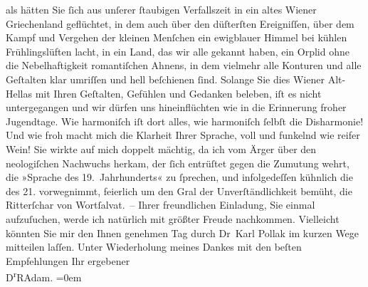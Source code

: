 \begin{ledgroupsized}[t]{13cm}
               als hätten Sie ſich aus unſerer ſtaubigen Verfallszeit in ein altes Wiener Griechenland
               geflüchtet, in dem auch über den düſterſten Ereigniſſen, über dem Kampf und Vergehen
                  der kleinen Menſchen ein ewigblauer
               Himmel bei kühlen Frühlingslüften lacht, in ein Land, das wir alle gekannt haben, ein
               Orplid ohne die Nebelhaftigkeit romantiſchen Ahnens, in dem vielmehr alle Konturen
               und alle Geſtalten klar umriſſen und hell beſchienen ſind. Solange Sie dies Wiener Alt-Hellas mit Ihren Geſtalten, Gefühlen und Gedanken beleben, iſt es nicht
               untergegangen und wir dürfen uns hineinflüchten wie in die Erinnerung froher
               Jugendtage. Wie harmoniſch iſt dort alles, wie harmoniſch ſelbſt die Disharmonie! Und
               wie froh macht mich die Klarheit Ihrer {\pb}Sprache, voll und funkelnd wie reifer Wein! Sie wirkte auf mich doppelt mächtig, da
               ich vom Ärger über den neologiſchen Nachwuchs herkam, der ſich entrüſtet gegen die
               Zumutung wehrt, die »Sprache des 19. Jahrhunderts« zu ſprechen, und infolgedeſſen
               kühnlich die des 21. vorwegnimmt, feierlich um den Gral der Unverſtändlichkeit
               bemüht, die Ritterſchar von Wortſalvat. –\pend
           \pstart
           Ihrer freundlichen Einladung, Sie einmal aufzuſuchen, werde ich natürlich mit größter
               Freude nachkommen. Vielleicht könnten Sie mir den Ihnen genehmen Tag durch Dr Karl Pollak im kurzen Wege mitteilen
               laſſen.\pend
           \pstart
           {\pb}Unter Wiederholung meines Dankes mit den
               beſten Empfehlungen\pend
           \pstart
           Ihr ergebener{\\[\baselineskip]}\spacefill\mbox{D\textsuperscript{r}RAdam.}\pend
           \leftskip=0em{}
         
         \endnumbering{}\end{ledgroupsized}  \newcommand{\dateiname}{L02485}\newcommand{\titel}{Robert Adam an Arthur Schnitzler, 1. 5. 1927}\newcommand{\editorInnen}{Martin Anton Müller und Gerd-Hermann Susen}
      